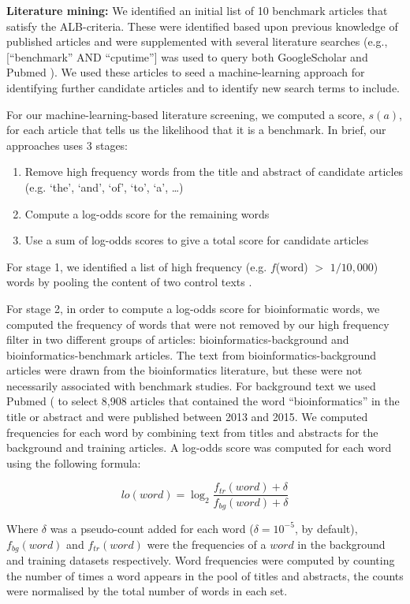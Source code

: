 \documentclass[fleqn,10pt]{SelfArx} %
\begin{document}
\textbf{Literature mining:} We identified an initial list of 10 benchmark
articles that satisfy the ALB-criteria. These were identified based
upon previous knowledge of published articles and were supplemented
with several literature searches (e.g., [``benchmark'' AND ``cputime''] was
used to query both GoogleScholar and Pubmed
\cite{Sayers2010-vm,McEntyre2001-fl}). We used these articles to seed
a machine-learning approach for identifying further candidate articles
and to identify new search terms to include.

For our machine-learning-based literature screening, we computed a
score, $s(a)$, for each article that tells us the likelihood that it
is a benchmark. In brief, our approaches uses 3 stages:
\begin{enumerate}
\item Remove high frequency words from the title and abstract of candidate articles (e.g. ‘the’, ‘and’, ‘of’, ‘to’, ‘a’, …) 
\item Compute a log-odds score for the remaining words 
\item Use a sum of log-odds scores to give a total score for candidate articles
\end{enumerate}
For stage 1, we identified a list of high frequency (e.g. $f$(word) $>$
$1/10,000$) words by pooling the content of two control texts
\cite{Carroll1865-hk,Tolkien1937-ke}.

For stage 2, in order to compute a log-odds score for bioinformatic
words, we computed the frequency of words that were not removed by our
high frequency filter in two different groups of articles:
bioinformatics-background and bioinformatics-benchmark articles. The
text from bioinformatics-background articles were drawn from the
bioinformatics literature, but these were not necessarily associated
with benchmark studies. For background text we used Pubmed
(\cite{Sayers2010-vm,McEntyre2001-fl} to select 8,908 articles that
contained the word “bioinformatics” in the title or abstract and were
published between 2013 and 2015. We computed frequencies for each word
by combining text from titles and abstracts for the background and
training articles. A log-odds score was computed for each word using
the following formula:

\[lo(word)=\log_2\frac{f_{tr}(word)+\delta}{f_{bg}(word)+\delta}\] 

Where
$\delta$
was a pseudo-count added for each word ($\delta = 10^{-5}$, by default),
$f_{bg}(word)$ and $f_{tr}(word)$ were the frequencies of a $word$ in
the background and training datasets respectively. Word frequencies
were computed by counting the number of times a word appears in the
pool of titles and abstracts, the counts were normalised by the total
number of words in each set.
\end{document}

